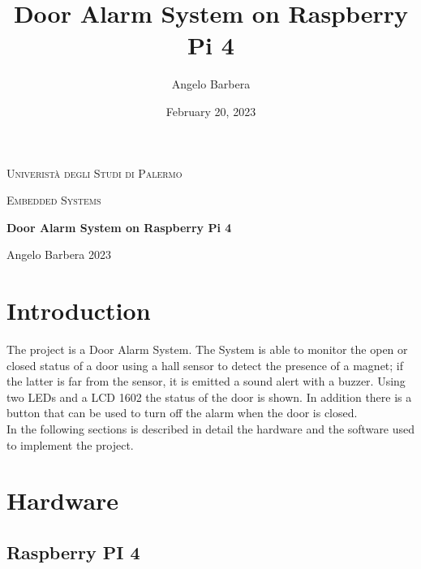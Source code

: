 \documentclass[]{article}
\title{\huge Door Alarm System on Raspberry Pi 4}
\author{Angelo Barbera}
\date{February 20, 2023}
\begin{document}
\begin{titlepage}
	\centering
	{\scshape\LARGE Univeristà degli Studi di Palermo \par}
	\vspace{0.6cm}
	{\scshape\Large Embedded Systems \par}
	\vspace{1.8cm}
	{\huge\bfseries Door Alarm System on Raspberry Pi 4 \par}
	\vspace{2cm}
	\vfill
	{\large Angelo Barbera 2023 \par}
\end{titlepage}


\tableofcontents

\clearpage
{}


\section{Introduction}
The project is a Door Alarm System. The System is able to monitor the open or closed status of a door using a hall sensor
to detect the presence of a magnet; if the latter is far from the sensor, it is emitted a sound alert with a buzzer. 
Using two LEDs and a LCD 1602 the status of the door is shown. In addition there is a button that can be used to 
turn off the alarm when the door is closed.
\\ 
In the following sections is described in detail the hardware and the software used to implement the project.

\section{Hardware}

\subsection{Raspberry PI 4}
\end{document}
